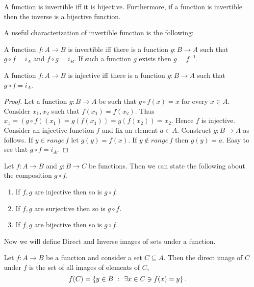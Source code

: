\begin{Theorem}
    A function is invertible iff it is bijective. Furthermore, if a function is invertible then
    the inverse is a bijective function.
\end{Theorem}

A useful characterization of invertible function is the following:
\begin{Theorem}
    A function $f : A \to B$ is invertible iff there is a function $g : B \to A$ such that $g \circ
    f = i_A$ and $f\circ g = i_B$. If such a function $g$ exists then $g = f^{-1}$.
\end{Theorem}

\begin{Theorem}
    A function $f : A \to B$ is injective iff there is a function $g : B \to A$ such that $g \circ
    f = i_A$.
\end{Theorem}
\begin{proof}
    Let a function $g : B \to A$ be such that $g\circ f (x) = x $ for every $x \in A$. Consider
    $x_1,x_2$ such that $f(x_1) = f(x_2)$. Thus $x_1 = (g \circ f)(x_1) = g(f(x_1)) = g(f(x_2)) = 
    x_2$. Hence $f$ is injective. Consider an injective function $f$ and fix an element $a \in A$.
    Construct $g : B \to A$ as follows. If $y \in range\,f$ let $g(y) = f(x)$. If $y \not \in
    range\,f$ then $g(y) = a$. Easy to see that $g\circ f = i_A$. 
\end{proof}

\begin{Theorem}
    Let $f : A \to B$ and $g : B \to C$ be functions. Then we can state the following about the
    composition $g \circ f$,
    \begin{enumerate}
	\item If $f,g$ are injective then so is $g \circ f$.
	\item If $f,g$ are surjective then so is $g \circ f$.
	\item If $f,g$ are bijective then so is $g \circ f$.
    \end{enumerate}
\end{Theorem}

Now we will define Direct and Inverse images of sets under a function.
\begin{Definition}
    Let $f : A \to B$ be a function and consider a set $C \subseteq A$. Then the direct image of $C$
    under $f$ is the set of all images of elements of $C$,
    \begin{equation*}
	f(C) = \left\lbrace{y \in B\hspace{0.05in}}:{\hspace{0.05in}\exists x \in C \ni f(x) = y} \right\rbrace.
    \end{equation*}
\end{Definition}

